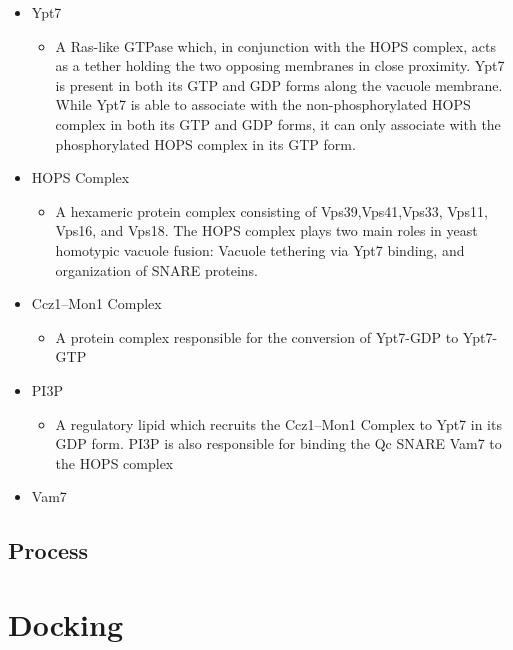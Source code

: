 \documentclass[12pt,twoside]{reedthesis}
\providecommand{\tightlist}{%
  \setlength{\itemsep}{0pt}\setlength{\parskip}{0pt}}
\begin{document}
\begin{itemize}
\tightlist
\item
  Ypt7

  \begin{itemize}
  \tightlist
  \item
    A Ras-like GTPase which, in conjunction with the HOPS complex, acts as a tether holding the two opposing membranes in close proximity. Ypt7 is present in both its GTP and GDP forms along the vacuole membrane. While Ypt7 is able to associate with the non-phosphorylated HOPS complex in both its GTP and GDP forms, it can only associate with the phosphorylated HOPS complex in its GTP form.
  \end{itemize}
\item
  HOPS Complex

  \begin{itemize}
  \tightlist
  \item
    A hexameric protein complex consisting of Vps39,Vps41,Vps33, Vps11, Vps16, and Vps18. The HOPS complex plays two main roles in yeast homotypic vacuole fusion: Vacuole tethering via Ypt7 binding, and organization of SNARE proteins.
  \end{itemize}
\item
  Ccz1--Mon1 Complex

  \begin{itemize}
  \tightlist
  \item
    A protein complex responsible for the conversion of Ypt7-GDP to Ypt7-GTP
  \end{itemize}
\item
  PI3P

  \begin{itemize}
  \tightlist
  \item
    A regulatory lipid which recruits the Ccz1--Mon1 Complex to Ypt7 in its GDP form. PI3P is also responsible for binding the Qc SNARE Vam7 to the HOPS complex
  \end{itemize}
\item
  Vam7
\end{itemize}

\subsection{Process}\label{process-1}

\section{Docking}\label{docking}
\end{document}
